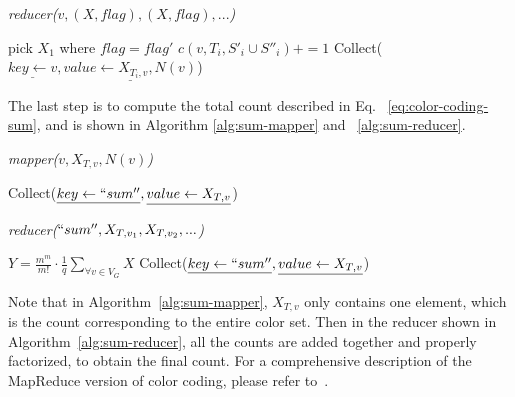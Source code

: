 \begin{algorithm}[ht]
  \caption{\emph{reducer($v, {(X, flag), (X, flag), ...}$)}}
  \label{alg:counter-reducer}
  \begin{algorithmic}[1]
    \STATE pick $X_1$ where $flag = flag'$
              \STATE $c(v, T_i, S'_i \cup S''_i) += 1$
            \ENDIF
          \ENDFOR
        \ENDFOR
      \ENDFOR 
    \STATE Collect($\underline{key \leftarrow v}, \underline{value \leftarrow X_{T_i, v}, N(v)}$)
  \end{algorithmic}
\end{algorithm}

The last step is to compute the total count described in Eq.
~\ref{eq:color-coding-sum}, and is shown in Algorithm \ref{alg:sum-mapper} and
~\ref{alg:sum-reducer}.

\begin{algorithm}[ht]
  \caption{\emph{mapper($v, X_{T, v}, N(v)$)}}
  \label{alg:sum-mapper}
  \begin{algorithmic}[1]
      \STATE Collect($\underline{key \leftarrow ``sum''}, \underline{value \leftarrow X_{T, v}}$)
  \end{algorithmic}
\end{algorithm}

\begin{algorithm}[ht]
  \caption{\emph{reducer($``sum'', {X_{T, v_1}, {X_{T, v_2},...}}$)}}
  \label{alg:sum-reducer}
  \begin{algorithmic}[1]
    \STATE $Y = \frac{m^m}{m!} \cdot \frac{1}{q}\sum_{\forall v \in V_G}X$
    \STATE Collect($\underline{key \leftarrow ``sum''}, \underline{value \leftarrow X_{T, v}}$)
  \end{algorithmic}
\end{algorithm}

Note that in Algorithm~\ref{alg:sum-mapper}, $X_{T,v}$ only contains one
element, which is the count corresponding to the entire color set. Then in the
reducer shown in Algorithm~\ref{alg:sum-reducer}, all the counts are added
together and properly factorized, to obtain the final count. For a
comprehensive description of the MapReduce version of color coding, please
refer to~\cite{zhao2012sahad}.

\subsection{\ensahad}
\label{sec:ensahad}


